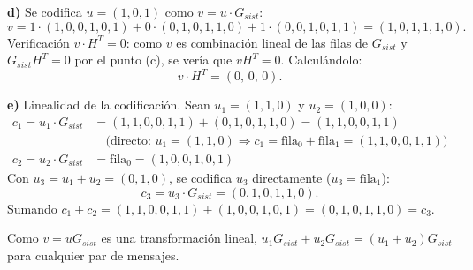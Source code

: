 \documentclass[11pt]{article}
\begin{document}
\textbf{d)} Se codifica $u=(1,0,1)$ como $v=u\cdot G_{sist}$:
$$v = 1\cdot(1,0,0,1,0,1) + 0\cdot(0,1,0,1,1,0) + 1\cdot(0,0,1,0,1,1) = (1,0,1,1,1,0).$$
Verificación $v\cdot H^T=0$: como $v$ es combinación lineal de las filas de $G_{sist}$ y
$G_{sist}H^T=0$ por el punto (c), se vería que $vH^T=0$. Calculándolo:
$$v\cdot H^T = (0,\,0,\,0).$$

\textbf{e)} Linealidad de la codificación. Sean $u_1=(1,1,0)$ y $u_2=(1,0,0)$:
\begin{align*}
c_1 = u_1\cdot G_{sist} &= (1,1,0,0,1,1) + (0,1,0,1,1,0) = (1,1,0,0,1,1) \\
&\quad\text{(directo: } u_1=(1,1,0)\Rightarrow c_1=\text{fila}_0+\text{fila}_1=(1,1,0,0,1,1)) \\
c_2 = u_2\cdot G_{sist} &= \text{fila}_0 = (1,0,0,1,0,1)
\end{align*}
Con $u_3=u_1+u_2=(0,1,0)$, se codifica $u_3$ directamente ($u_3=\text{fila}_1$):
$$c_3 = u_3\cdot G_{sist} = (0,1,0,1,1,0).$$
Sumando $c_1+c_2 = (1,1,0,0,1,1)+(1,0,0,1,0,1) = (0,1,0,1,1,0) = c_3$. 

Como $v=uG_{sist}$ es una transformación lineal, $u_1G_{sist}+u_2G_{sist} =
(u_1+u_2)G_{sist}$ para cualquier par de mensajes.
\end{document}
